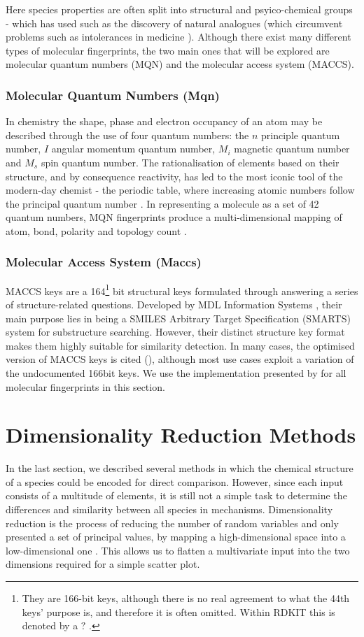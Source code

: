 Here species properties are often split into structural and psyico-chemical groups - which has used such as the discovery of natural analogues (which circumvent problems such as intolerances in medicine \citep{analog}). Although there exist many different types of molecular fingerprints, the two main ones that will be explored are molecular quantum numbers (MQN) and the molecular access system (MACCS).

\subsubsection{Molecular Quantum Numbers (Mqn)}
In chemistry the shape, phase and electron occupancy of an atom may be described through the use of four quantum numbers: the $n$ principle quantum number, $I$ angular momentum quantum number, $M_i$ magnetic quantum number and $M_s$ spin quantum number. The rationalisation of elements based on their structure, and by consequence reactivity, has led to the most iconic tool of the modern-day chemist - the periodic table, where increasing atomic numbers follow the principal quantum number \citep{periodic}. In representing a molecule as a set of 42 quantum numbers, MQN fingerprints produce a multi-dimensional mapping of atom, bond, polarity and topology count \citep{MQN}.


\subsubsection{Molecular Access System (Maccs)}
MACCS keys are a 164\footnote{They are 166-bit keys, although there is no real agreement to what the 44th keys' purpose is, and therefore it is often omitted. Within RDKIT this is denoted by a $?$ \citep{rdkitcode}.} bit structural keys formulated through answering a series of structure-related questions. Developed by MDL Information Systems \citep{maccs}, their main purpose lies in being a SMILES Arbitrary Target Specification (SMARTS) system for substructure searching. However, their distinct structure key format makes them highly suitable for similarity detection. In many cases, the optimised version of MACCS keys is cited (\citep{optimised}), although most use cases exploit a variation of the undocumented 166bit keys. We use the implementation presented by \citep{rdkit,rdkitcode} for all molecular fingerprints in this section.


\section{ Dimensionality Reduction Methods}
In the last section, we described several methods in which the chemical structure of a species could be encoded for direct comparison. However, since each input consists of a multitude of elements, it is still not a simple task to determine the differences and similarity between all species in mechanisms. Dimensionality reduction is the process of reducing the number of random variables and only presented a set of principal values, by mapping a high-dimensional space into a low-dimensional one \citep{drrandom}. This allows us to flatten a multivariate input into the two dimensions required for a simple scatter plot.

